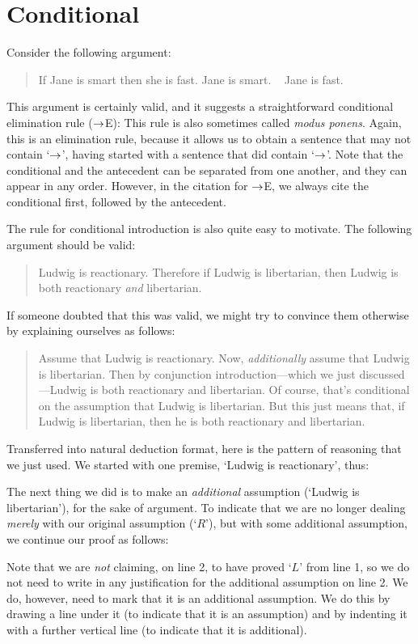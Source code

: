\section{Conditional}
Consider the following argument:
	\begin{quote}
		If Jane is smart then she is fast. Jane is smart. \therefore~ Jane is fast.
	\end{quote}
This argument is certainly valid, and it suggests a straightforward conditional elimination rule ($\rightarrow$E):
This rule is also sometimes called \emph{modus ponens}. Again, this is an elimination rule, because it allows us to obtain a sentence that may not contain `$\rightarrow$', having started with a sentence that did contain `$\rightarrow$'. Note that the conditional and the antecedent can be separated from one another, and they can appear in any order. However, in the citation for $\rightarrow$E, we always cite the conditional first, followed by the antecedent.

The rule for conditional introduction is also quite easy to motivate. The following argument should be valid:
	\begin{quote}
		Ludwig is reactionary. Therefore if Ludwig is libertarian, then Ludwig is both reactionary \emph{and} libertarian.
	\end{quote}
If someone doubted that this was valid, we might try to convince them otherwise by explaining ourselves as follows:
	\begin{quote}
		Assume that Ludwig is reactionary. Now, \emph{additionally} assume that Ludwig is libertarian. Then by conjunction introduction---which we just discussed---Ludwig is both reactionary and libertarian. Of course, that's conditional on the assumption that Ludwig is libertarian. But this just means that, if Ludwig is libertarian, then he is both reactionary and libertarian.
	\end{quote}
Transferred into natural deduction format, here is the pattern of reasoning that we just used. We started with one premise, `Ludwig is reactionary', thus:
	\begin{pf}
	\end{pf}
The next thing we did is to make an \emph{additional} assumption (`Ludwig is libertarian'), for the sake of argument. To indicate that we are no longer dealing \emph{merely} with our original assumption (`$R$'), but with some additional assumption, we continue our proof as follows:
	\begin{pf}
		\hypo{r}{R}
		\open
			\hypo{l}{L}
	\end{pf}
Note that we are \emph{not} claiming, on line 2, to have proved `$L$' from line 1, so we do not need to write in any justification for the additional assumption on line 2. We do, however, need to mark that it is an additional assumption. We do this by drawing a line under it (to indicate that it is an assumption) and by indenting it with a further vertical line (to indicate that it is additional). 

